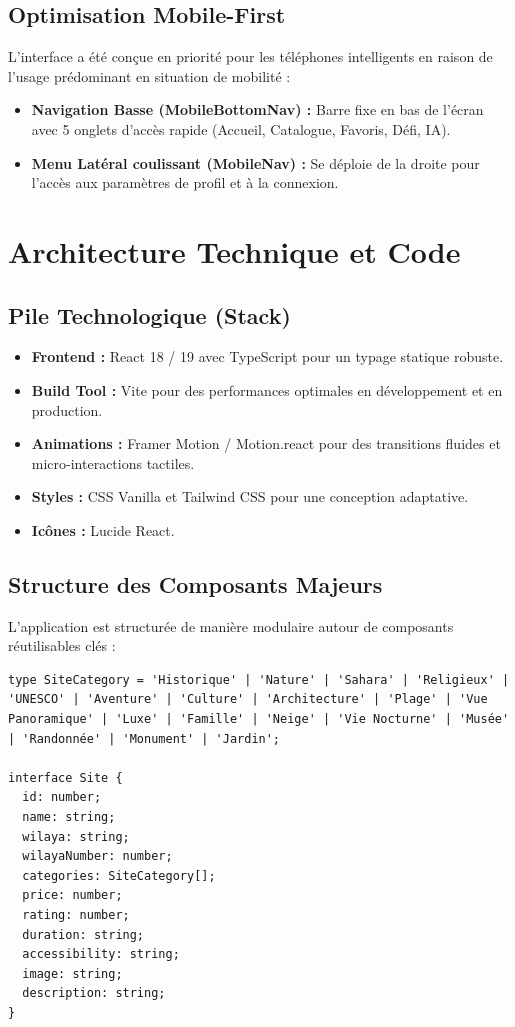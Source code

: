 \documentclass[11pt,a4paper]{article}
\begin{document}
\subsection{Optimisation Mobile-First}
L'interface a été conçue en priorité pour les téléphones intelligents en raison de l'usage prédominant en situation de mobilité :
\begin{itemize}
    \item \textbf{Navigation Basse (MobileBottomNav) :} Barre fixe en bas de l'écran avec 5 onglets d'accès rapide (Accueil, Catalogue, Favoris, Défi, IA).
    \item \textbf{Menu Latéral coulissant (MobileNav) :} Se déploie de la droite pour l'accès aux paramètres de profil et à la connexion.
\end{itemize}

\section{Architecture Technique et Code}

\subsection{Pile Technologique (Stack)}
\begin{itemize}
    \item \textbf{Frontend :} React 18 / 19 avec TypeScript pour un typage statique robuste.
    \item \textbf{Build Tool :} Vite pour des performances optimales en développement et en production.
    \item \textbf{Animations :} Framer Motion / Motion.react pour des transitions fluides et micro-interactions tactiles.
    \item \textbf{Styles :} CSS Vanilla et Tailwind CSS pour une conception adaptative.
    \item \textbf{Icônes :} Lucide React.
\end{itemize}

\subsection{Structure des Composants Majeurs}
L'application est structurée de manière modulaire autour de composants réutilisables clés :
\begin{lstlisting}[caption={Exemple de typage pour les sites touristiques}]
type SiteCategory = 'Historique' | 'Nature' | 'Sahara' | 'Religieux' | 'UNESCO' | 'Aventure' | 'Culture' | 'Architecture' | 'Plage' | 'Vue Panoramique' | 'Luxe' | 'Famille' | 'Neige' | 'Vie Nocturne' | 'Musée' | 'Randonnée' | 'Monument' | 'Jardin';

interface Site {
  id: number;
  name: string;
  wilaya: string;
  wilayaNumber: number;
  categories: SiteCategory[];
  price: number;
  rating: number;
  duration: string;
  accessibility: string;
  image: string;
  description: string;
}
\end{lstlisting}
\end{document}

